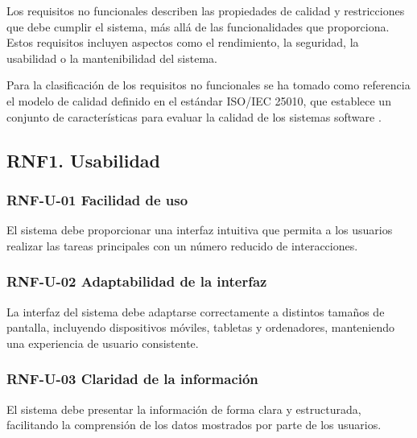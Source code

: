 Los requisitos no funcionales describen las propiedades de calidad y restricciones que debe cumplir el sistema, más allá de las funcionalidades que proporciona. Estos requisitos incluyen aspectos como el rendimiento, la seguridad, la usabilidad o la mantenibilidad del sistema.

Para la clasificación de los requisitos no funcionales se ha tomado como referencia el modelo de calidad definido en el estándar ISO/IEC 25010, que establece un conjunto de características para evaluar la calidad de los sistemas software \cite{iso25010}.

\subsection{RNF1. Usabilidad}

\vspace{-0.75em}
\subsubsection{RNF-U-01 Facilidad de uso}
\vspace{-1em}

El sistema debe proporcionar una interfaz intuitiva que permita a los usuarios realizar las tareas principales con un número reducido de interacciones.

\vspace{-0.75em}
\subsubsection{RNF-U-02 Adaptabilidad de la interfaz}
\vspace{-1em}

La interfaz del sistema debe adaptarse correctamente a distintos tamaños de pantalla, incluyendo dispositivos móviles, tabletas y ordenadores, manteniendo una experiencia de usuario consistente.

\vspace{-0.75em}
\subsubsection{RNF-U-03 Claridad de la información}
\vspace{-1em}

El sistema debe presentar la información de forma clara y estructurada, facilitando la comprensión de los datos mostrados por parte de los usuarios.

